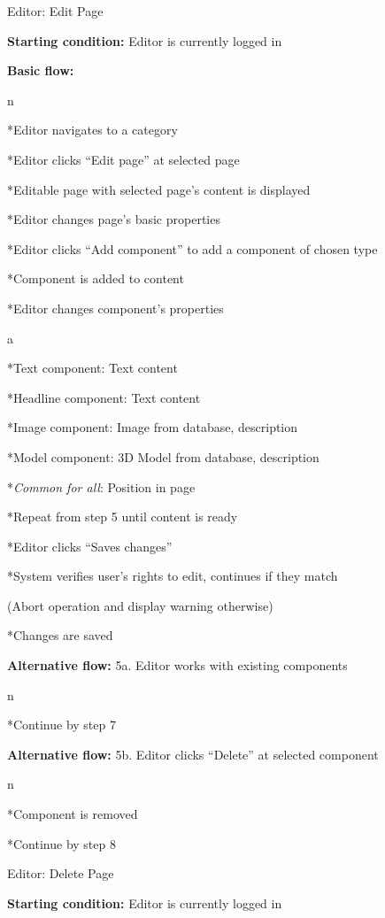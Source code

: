 \secc Editor: Edit Page

{\bf Starting condition:} Editor is currently logged in

{\bf Basic flow:}

\begitems \style n

*Editor navigates to a category

*Editor clicks “Edit page” at selected page

*Editable page with selected page’s content is displayed

*Editor changes page's basic properties

*Editor clicks “Add component” to add a component of chosen type

*Component is added to content

*Editor changes component’s properties

\begitems \style a

*Text component: Text content

*Headline component: Text content

*Image component: Image from database, description

*Model component: 3D Model from database, description

*{\it Common for all}: Position in page 

\enditems

*Repeat from step 5 until content is ready

*Editor clicks “Saves changes”

*System verifies user’s rights to edit, continues if they match

(Abort operation and display warning otherwise)

*Changes are saved

\enditems

{\bf Alternative flow:} 5a. Editor works with existing components

\begitems \style n

*Continue by step 7

\enditems

{\bf Alternative flow:} 5b. Editor clicks “Delete” at selected component

\begitems \style n

*Component is removed

*Continue by step 8

\enditems

\secc Editor: Delete Page

{\bf Starting condition:} Editor is currently logged in

